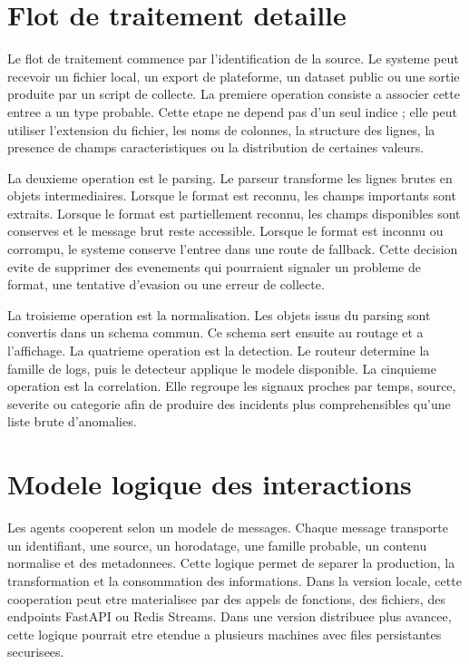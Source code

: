 \section{Flot de traitement detaille}
Le flot de traitement commence par l'identification de la source. Le systeme peut recevoir un fichier local, un export de plateforme, un dataset public ou une sortie produite par un script de collecte. La premiere operation consiste a associer cette entree a un type probable. Cette etape ne depend pas d'un seul indice ; elle peut utiliser l'extension du fichier, les noms de colonnes, la structure des lignes, la presence de champs caracteristiques ou la distribution de certaines valeurs.

La deuxieme operation est le parsing. Le parseur transforme les lignes brutes en objets intermediaires. Lorsque le format est reconnu, les champs importants sont extraits. Lorsque le format est partiellement reconnu, les champs disponibles sont conserves et le message brut reste accessible. Lorsque le format est inconnu ou corrompu, le systeme conserve l'entree dans une route de fallback. Cette decision evite de supprimer des evenements qui pourraient signaler un probleme de format, une tentative d'evasion ou une erreur de collecte.

La troisieme operation est la normalisation. Les objets issus du parsing sont convertis dans un schema commun. Ce schema sert ensuite au routage et a l'affichage. La quatrieme operation est la detection. Le routeur determine la famille de logs, puis le detecteur applique le modele disponible. La cinquieme operation est la correlation. Elle regroupe les signaux proches par temps, source, severite ou categorie afin de produire des incidents plus comprehensibles qu'une liste brute d'anomalies.

\section{Modele logique des interactions}
Les agents cooperent selon un modele de messages. Chaque message transporte un identifiant, une source, un horodatage, une famille probable, un contenu normalise et des metadonnees. Cette logique permet de separer la production, la transformation et la consommation des informations. Dans la version locale, cette cooperation peut etre materialisee par des appels de fonctions, des fichiers, des endpoints FastAPI ou Redis Streams. Dans une version distribuee plus avancee, cette logique pourrait etre etendue a plusieurs machines avec files persistantes securisees.

